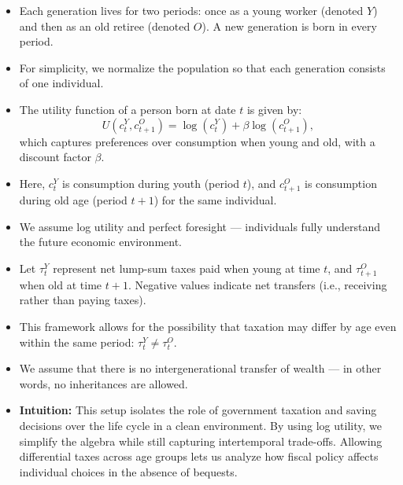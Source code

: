\documentclass[12pt]{article}
\begin{document}
\begin{itemize}
\item Each generation lives for two periods: once as a young worker (denoted \( Y \)) and then as an old retiree (denoted \( O \)). A new generation is born in every period.

\item For simplicity, we normalize the population so that each generation consists of one individual.

\item The utility function of a person born at date \( t \) is given by:
\[
U(c_t^Y, c_{t+1}^O) = \log(c_t^Y) + \beta \log(c_{t+1}^O),
\]
which captures preferences over consumption when young and old, with a discount factor \( \beta \).

\item Here, \( c_t^Y \) is consumption during youth (period \( t \)), and \( c_{t+1}^O \) is consumption during old age (period \( t+1 \)) for the same individual.

\item We assume log utility and perfect foresight — individuals fully understand the future economic environment.

\item Let \( \tau_t^Y \) represent net lump-sum taxes paid when young at time \( t \), and \( \tau_{t+1}^O \) when old at time \( t+1 \). Negative values indicate net transfers (i.e., receiving rather than paying taxes).

\item This framework allows for the possibility that taxation may differ by age even within the same period: \( \tau_t^Y \ne \tau_t^O \).

\item We assume that there is no intergenerational transfer of wealth — in other words, no inheritances are allowed.

\item \textbf{Intuition:} This setup isolates the role of government taxation and saving decisions over the life cycle in a clean environment. By using log utility, we simplify the algebra while still capturing intertemporal trade-offs. Allowing differential taxes across age groups lets us analyze how fiscal policy affects individual choices in the absence of bequests.
\end{itemize}
\end{document}
